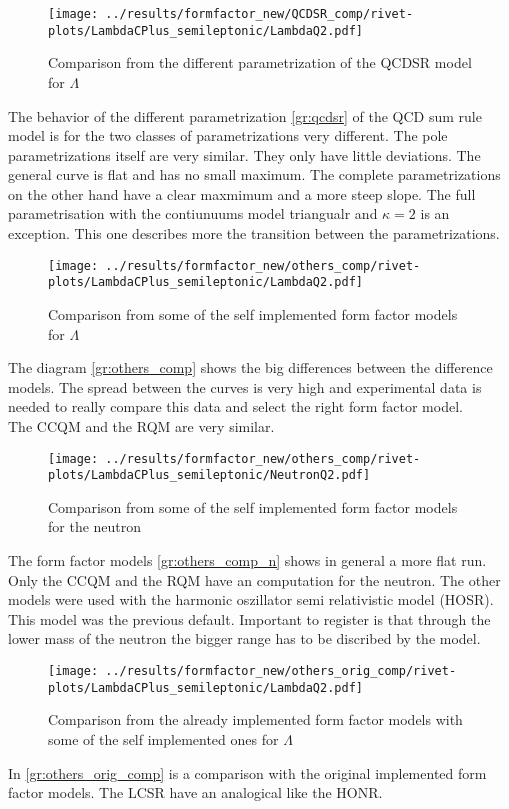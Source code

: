 \begin{figure}[h]
  \centering
  \texttt{[image: ../results/formfactor\_new/QCDSR\_comp/rivet-plots/LambdaCPlus\_semileptonic/LambdaQ2.pdf]}
  \caption{Comparison from the different parametrization of the QCDSR model for \(\Lambda\)} \label{gr:qcdsr}
\end{figure}
The behavior of the different parametrization {\eqref{gr:qcdsr}} of the QCD sum 
rule model is for the two classes of parametrizations very different. The pole 
parametrizations itself are very similar. They only have little deviations. The 
general curve is flat and has no small maximum. The complete parametrizations 
on the other hand have a clear maxmimum and a more steep slope. The full 
parametrisation with the contiunuums model triangualr and \(\kappa = 2\) is an 
exception. This one describes more the transition between the parametrizations.

\begin{figure}[h]
  \centering
  \texttt{[image: ../results/formfactor\_new/others\_comp/rivet-plots/LambdaCPlus\_semileptonic/LambdaQ2.pdf]}
  \caption{Comparison from some of the self implemented form factor models for \(\Lambda\)} \label{gr:others_comp}
\end{figure}
The diagram {\eqref{gr:others_comp}} shows the big differences between the 
difference models. The spread between the curves is very high and 
experimental data is needed to really compare this data and select the 
right form factor model.\\
The CCQM and the RQM are very similar.

\begin{figure}[h]
  \centering
  \texttt{[image: ../results/formfactor\_new/others\_comp/rivet-plots/LambdaCPlus\_semileptonic/NeutronQ2.pdf]}
  \caption{Comparison from some of the self implemented form factor models for the neutron} \label{gr:others_comp_n}
\end{figure}
The form factor models {\eqref{gr:others_comp_n}} shows in general a more 
flat run. Only the CCQM and the RQM have an computation for the neutron.
The other models were used with the harmonic oszillator semi relativistic 
model (HOSR). This model was the previous default. Important to register is that 
through the lower mass of the neutron the bigger range has to be discribed 
by the model.

\begin{figure}[h]
  \centering
  \texttt{[image: ../results/formfactor\_new/others\_orig\_comp/rivet-plots/LambdaCPlus\_semileptonic/LambdaQ2.pdf]}
  \caption{Comparison from the already implemented form factor models with 
  some of the self implemented ones for \(\Lambda\)} \label{gr:others_orig_comp}
\end{figure}
In {\eqref{gr:others_orig_comp}} is a comparison with the original implemented 
form factor models. The LCSR have an analogical like the HONR.

